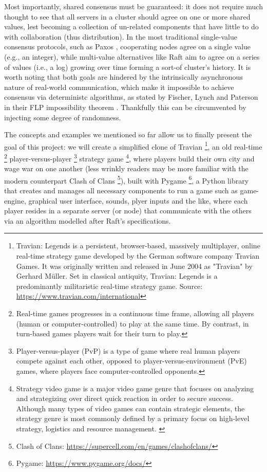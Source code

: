 Most importantly, shared consensus must be guaranteed: it does not require much thought to see that all servers in a cluster should agree on one or more shared values, lest becoming a collection of un-related components that have little to do with collaboration (thus distribution). In the most traditional single-value consensus protocols, such as Paxos \cite{paxos}, cooperating nodes agree on a single value (e.g., an integer), while multi-value alternatives like Raft \cite{raft} aim to agree on a series of values (i.e., a log) growing over time forming a sort-of cluster's history. It is worth noting that both goals are hindered by the intrinsically asynchronous nature of real-world communication, which make it impossible to achieve consensus via deterministc algorithms, as stated by Fischer, Lynch and Paterson in their FLP impossibility theorem \cite{flp}. Thankfully this can be circumvented by injecting some degree of randomness.

The concepts and examples we mentioned so far allow us to finally present the goal of this project: we will create a simplified clone of Travian \footnote{Travian: Legends is a persistent, browser-based, massively multiplayer, online real-time strategy game developed by the German software company Travian Games. It was originally written and released in June 2004 as "Travian" by Gerhard Müller. Set in classical antiquity, Travian: Legends is a predominantly militaristic real-time strategy game. Source: \url{https://www.travian.com/international}}, an old real-time \footnote{Real-time games progresses in a continuous time frame, allowing all players (human or computer-controlled) to play at the same time. By contrast, in turn-based games players wait for their turn to play.} player-versus-player \footnote{Player-versus-player (PvP) is a type of game where real human players compete against each other, opposed to player-versus-environment (PvE) games, where players face computer-controlled opponents.} strategy game \footnote{Strategy video game is a major video game genre that focuses on analyzing and strategizing over direct quick reaction in order to secure success. Although many types of video games can contain strategic elements, the strategy genre is most commonly defined by a primary focus on high-level strategy, logistics and resource management. \cite{rollings2003andrew}}, where players build their own city and wage war on one another (less wrinkly readers may be more familiar with the modern counterpart Clash of Clans \footnote{Clash of Clans: \url{https://supercell.com/en/games/clashofclans/}}), built with Pygame \footnote{Pygame: \url{https://www.pygame.org/docs/}}, a Python library that creates and manages all necessary components to run a game such as game-engine, graphical user interface, sounds, plyer inputs and the like, where each player resides in a separate server (or node) that communicate with the others via an algorithm modelled after Raft's specifications. 

